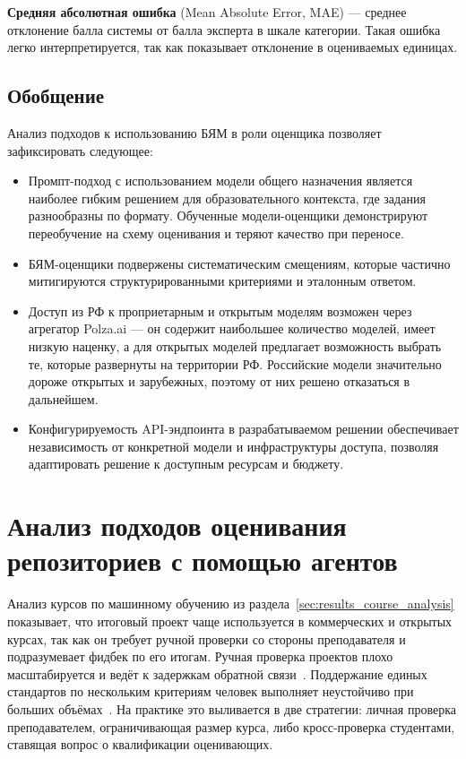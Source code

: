 \textbf{Средняя абсолютная ошибка} (Mean Absolute Error, MAE) --- среднее отклонение балла системы от балла эксперта в шкале категории. Такая ошибка легко интерпретируется, так как показывает отклонение в оцениваемых единицах.


\subsection{Обобщение}

Анализ подходов к использованию БЯМ в роли оценщика позволяет зафиксировать следующее:

\begin{itemize}
    \item Промпт-подход с использованием модели общего назначения является наиболее гибким решением для образовательного контекста, где задания разнообразны по формату. Обученные модели-оценщики демонстрируют переобучение на схему оценивания и теряют качество при переносе.
    \item БЯМ-оценщики подвержены систематическим смещениям, которые частично митигируются структурированными критериями и эталонным ответом.
    \item Доступ из РФ к проприетарным и открытым моделям возможен через агрегатор Polza.ai --- он содержит наибольшее количество моделей, имеет низкую наценку, а для открытых моделей предлагает возможность выбрать те, которые развернуты на территории РФ. Российские модели значительно дороже открытых и зарубежных, поэтому от них решено отказаться в дальнейшем.
    \item Конфигурируемость API-эндпоинта в разрабатываемом решении обеспечивает независимость от конкретной модели и инфраструктуры доступа, позволяя адаптировать решение к доступным ресурсам и бюджету.
\end{itemize}

\section{Анализ подходов оценивания репозиториев с помощью агентов}
\label{sec:project_grading}

Анализ курсов по машинному обучению из раздела~\ref{sec:results_course_analysis}
показывает, что итоговый проект чаще используется в коммерческих и открытых курсах, так как он требует
ручной проверки со стороны преподавателя и подразумевает фидбек по его итогам.
Ручная проверка проектов плохо масштабируется и ведёт к задержкам
обратной связи~\cite{stepgrade2025, autograderplus2025, cograder2025}.
Поддержание единых стандартов по нескольким критериям человек выполняет
неустойчиво при больших объёмах~\cite{cograder2025}. На практике это
выливается в две стратегии: личная проверка преподавателем, ограничивающая
размер курса, либо кросс-проверка студентами, ставящая вопрос о
квалификации оценивающих.

